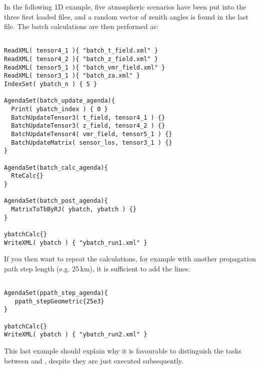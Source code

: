 In the following 1D example, five atmospheric scenarios
have been put into the three first loaded files, and a random vector
of zenith angles is found in the last file. The batch calculations
are then performed as:
\begin{verbatim}

ReadXML( tensor4_1 ){ "batch_t_field.xml" }
ReadXML( tensor4_2 ){ "batch_z_field.xml" }
ReadXML( tensor5_1 ){ "batch_vmr_field.xml" }
ReadXML( tensor3_1 ){ "batch_za.xml" }
IndexSet( ybatch_n ) { 5 }

AgendaSet(batch_update_agenda){
  Print( ybatch_index ) { 0 }
  BatchUpdateTensor3( t_field, tensor4_1 ) {}
  BatchUpdateTensor3( z_field, tensor4_2 ) {}
  BatchUpdateTensor4( vmr_field, tensor5_1 ) {}
  BatchUpdateMatrix( sensor_los, tensor3_1 ) {}
}

AgendaSet(batch_calc_agenda){
  RteCalc{}
}

AgendaSet(batch_post_agenda){
  MatrixToTbByRJ( ybatch, ybatch ) {}
}

ybatchCalc{}
WriteXML( ybatch ) { "ybatch_run1.xml" }

\end{verbatim}
If you then want to repeat the calculations, for example with another
propagation path step length (e.g. 25\,km), it is sufficient to add
the lines:
\begin{verbatim}

AgendaSet(ppath_step_agenda){
   ppath_stepGeometric{25e3}
}

ybatchCalc{}
WriteXML( ybatch ) { "ybatch_run2.xml" }

\end{verbatim}
This last example should explain why it is favourable to distinguish
the tasks between  and
, despite they are just executed
subsequently.



